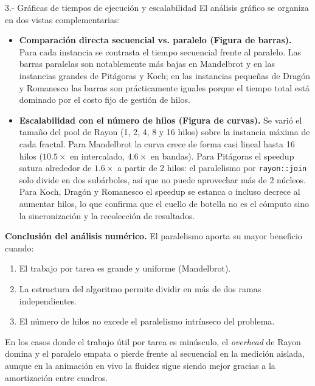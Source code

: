 \begin{respuesta}{3.- Gráficas de tiempos de ejecución y escalabilidad}
    El análisis gráfico se organiza en dos vistas complementarias:

    \begin{itemize}
        \item \textbf{Comparación directa secuencial vs. paralelo (Figura de barras).}
        Para cada instancia se contrasta el tiempo secuencial frente al paralelo. Las barras paralelas son notablemente más bajas en Mandelbrot y en las instancias grandes de Pitágoras y Koch; en las instancias pequeñas de Dragón y Romanesco las barras son prácticamente iguales porque el tiempo total está dominado por el costo fijo de gestión de hilos.

        \item \textbf{Escalabilidad con el número de hilos (Figura de curvas).} Se varió el tamaño del pool de Rayon (1, 2, 4, 8 y 16 hilos) sobre la instancia máxima de cada fractal. Para Mandelbrot la curva crece de forma casi lineal hasta 16 hilos ($10.5\times$ en intercalado, $4.6\times$ en bandas). Para Pitágoras el speedup satura alrededor de $1.6\times$ a partir de 2 hilos: el paralelismo por \texttt{rayon::join} solo divide en dos subárboles, así que no puede aprovechar más de 2 núcleos. Para Koch, Dragón y Romanesco el speedup se estanca o incluso decrece al aumentar hilos, lo que confirma que el cuello de botella no es el cómputo sino la sincronización y la recolección de resultados.
    \end{itemize}

    \textbf{Conclusión del análisis numérico.} El paralelismo aporta su mayor beneficio cuando:
    \begin{enumerate}
        \item El trabajo por tarea es grande y uniforme (Mandelbrot).
        \item La estructura del algoritmo permite dividir en más de dos ramas independientes.  
        \item El número de hilos no excede el paralelismo intrínseco del problema. 
    \end{enumerate}
    En los casos donde el trabajo útil por tarea es minúsculo, el \textit{overhead} de Rayon domina y el paralelo empata o pierde frente al secuencial en la medición aislada, aunque en la animación en vivo la fluidez sigue siendo mejor gracias a la amortización entre cuadros.
\end{respuesta}

